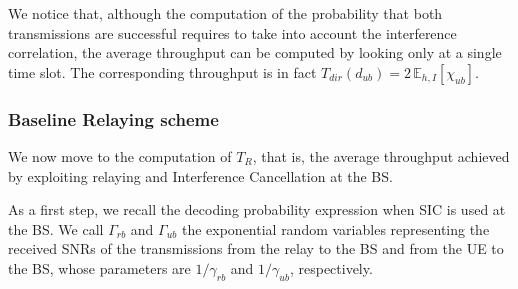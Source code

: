 \documentclass[12pt, letterpaper, onecolumn, draftcls]{IEEEtran}
\begin{document}
We notice that, although the computation of the probability that both transmissions are successful requires to take into account the interference correlation, the average throughput can be computed by looking only at a single time slot. The corresponding throughput is in fact $T_{dir}(d_{ub}) = 2\,\mathbb{E}_{h,I}\left[\chi_{ub}\right]$.

\subsubsection{Baseline Relaying scheme}
We now move to the computation of $T_R$, that is, the average throughput achieved by exploiting relaying and Interference Cancellation at the BS.

As a first step, we recall the decoding probability expression when SIC is used at the BS. We call $\Gamma_{rb}$ and $\Gamma_{ub}$ the exponential random variables representing the received SNRs of the transmissions from the relay to the BS and from the UE to the BS, whose parameters are $1/\gamma_{rb}$ and $1/\gamma_{ub}$, respectively.
\end{document}
